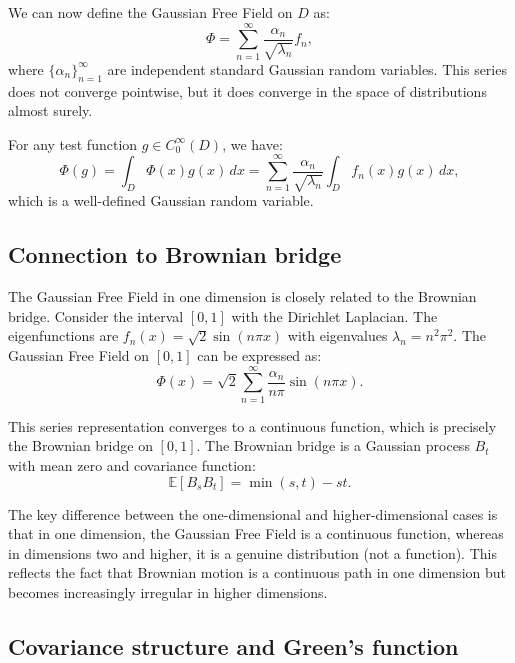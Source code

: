 \documentclass[letterpaper,11pt,oneside,reqno]{article}
\numberwithin{equation}{section}
\theoremstyle{definition}
\begin{document}
We can now define the Gaussian Free Field on $D$ as:
\begin{equation}
    \Phi = \sum_{n=1}^{\infty} \frac{\alpha_n}{\sqrt{\lambda_n}} f_n,
\end{equation}
where $\{\alpha_n\}_{n=1}^{\infty}$ are independent standard Gaussian random variables. This series does not converge pointwise, but it does converge in the space of distributions almost surely.

For any test function $g \in C_0^{\infty}(D)$, we have:
\begin{equation}
    \Phi(g) = \int_D \Phi(x) g(x) \, dx = \sum_{n=1}^{\infty} \frac{\alpha_n}{\sqrt{\lambda_n}} \int_D f_n(x) g(x) \, dx,
\end{equation}
which is a well-defined Gaussian random variable.

\subsection{Connection to Brownian bridge}

The Gaussian Free Field in one dimension is closely related to the Brownian bridge. Consider the interval $[0,1]$ with the Dirichlet Laplacian. The eigenfunctions are $f_n(x) = \sqrt{2} \sin(n\pi x)$ with eigenvalues $\lambda_n = n^2 \pi^2$. The Gaussian Free Field on $[0,1]$ can be expressed as:
\begin{equation}
    \Phi(x) = \sqrt{2} \sum_{n=1}^{\infty} \frac{\alpha_n}{n\pi} \sin(n\pi x).
\end{equation}

This series representation converges to a continuous function, which is precisely the Brownian bridge on $[0,1]$. The Brownian bridge is a Gaussian process $B_t$ with mean zero and covariance function:
\begin{equation}
    \mathbb{E}[B_s B_t] = \min(s, t) - st.
\end{equation}

The key difference between the one-dimensional and higher-dimensional cases is that in one dimension, the Gaussian Free Field is a continuous function, whereas in dimensions two and higher, it is a genuine distribution (not a function). This reflects the fact that Brownian motion is a continuous path in one dimension but becomes increasingly irregular in higher dimensions.

\subsection{Covariance structure and Green's function}
\end{document}
